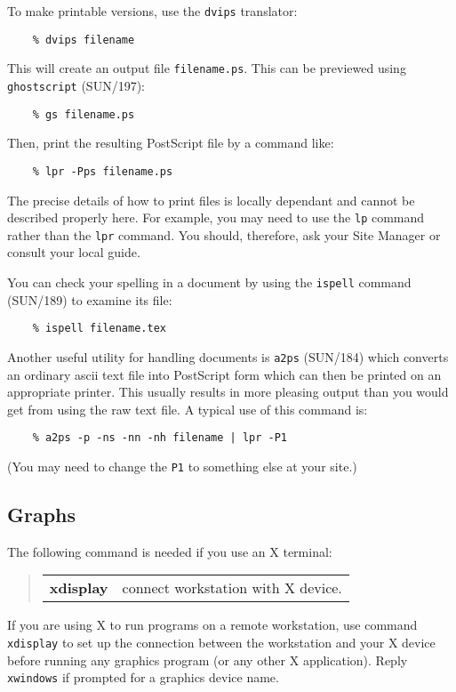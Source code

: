 \documentclass[twoside,11pt]{article}
\newcommand{\xref}[3]{#1}
\begin{document}
To make printable versions, use the {\tt dvips} translator:
\begin{verbatim}
    % dvips filename
\end{verbatim}
This will create an output file {\tt filename.ps}. This can be previewed
using {\tt ghostscript}
(\xref{SUN/197}{sun197}{}):
\begin{verbatim}
    % gs filename.ps
\end{verbatim}
Then, print the resulting PostScript file by a command like:
\begin{verbatim}
    % lpr -Pps filename.ps
\end{verbatim}
The precise details of how to print files is locally dependant and cannot
be described properly here.
For example, you may need to use the {\tt lp} command rather than the
{\tt lpr} command.
You should, therefore, ask your Site Manager or consult your local guide.

You can check your spelling in a document by using the {\tt ispell} command
(\xref{SUN/189}{sun189}{}) to examine its file:
\begin{verbatim}
    % ispell filename.tex
\end{verbatim}

Another useful utility for handling documents is {\tt a2ps}
(\xref{SUN/184}{sun184}{}) which
converts an ordinary ascii text file into PostScript form which can then
be printed on an appropriate printer.
This usually results in more pleasing output than you would get from using the
raw text file.
A typical use of this command is:
\begin{verbatim}
    % a2ps -p -ns -nn -nh filename | lpr -P1
\end{verbatim}
(You may need to change the {\tt P1} to something else at your site.)

\subsection{Graphs}

The following command is needed if you use an X terminal:
\begin{quote}
\begin{tabular}{lp{67mm}}

{\bf xdisplay}  & connect workstation with X device.

\end{tabular}
\end{quote}
If you are using X to run programs on a remote workstation, use command
{\tt xdisplay} to set up the connection between the workstation and your X
device before running any graphics program (or any other X application).
Reply {\tt xwindows} if prompted for a graphics device name.
\end{document}

